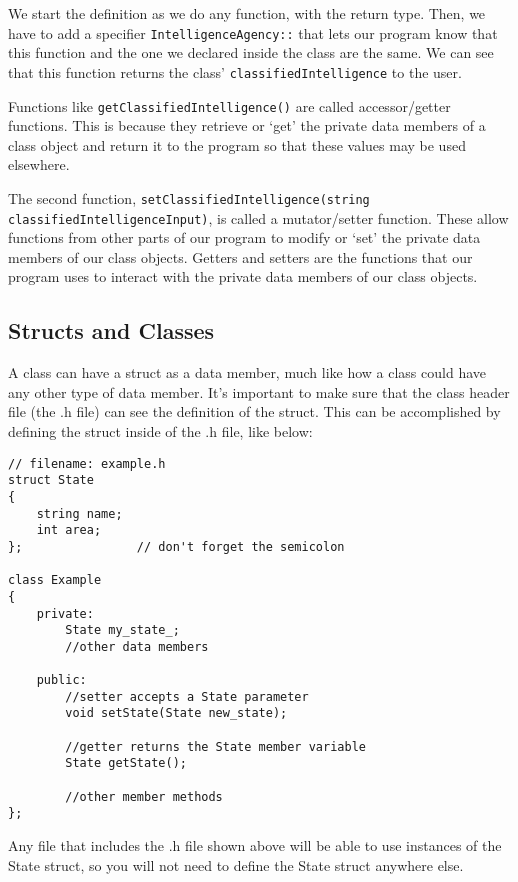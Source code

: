 We start the definition as we do any function, with the return type. Then, we have to add a specifier \texttt{IntelligenceAgency::} that lets our program know that this function and the one we declared inside the class are the same. We can see that this function returns the class’ \texttt{classifiedIntelligence} to the user.

Functions like \texttt{getClassifiedIntelligence()} are called accessor/getter functions. This is because they retrieve or `get’ the private data members of a class object and return it to the program so that these values may be used elsewhere.

The second function, \texttt{setClassifiedIntelligence(string classifiedIntelligenceInput)}, is called a mutator/setter function. These allow functions from other parts of our program to modify or ‘set’ the private data members of our class objects. Getters and setters are the functions that our program uses to interact with the private data members of our class objects.

\subsection{Structs and Classes}

A class can have a struct as a data member, much like how a class could have any other type of data member. It's important to make sure that the class header file (the .h file) can see the definition of the struct. This can be accomplished by defining the struct inside of the .h file, like below:

\begin{verbatim}
// filename: example.h
struct State
{
    string name;
    int area;
};                // don't forget the semicolon

class Example
{
    private:
        State my_state_;
        //other data members

    public:
        //setter accepts a State parameter
        void setState(State new_state);

        //getter returns the State member variable
        State getState();

        //other member methods
};
\end{verbatim}

Any file that includes the .h file shown above will be able to use instances of the State struct, so you will not need to define the State struct anywhere else.

